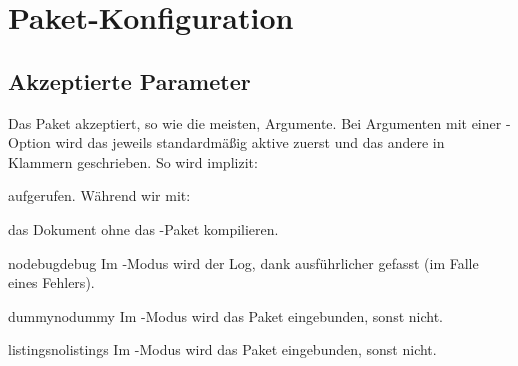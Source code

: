 \documentclass{sopra-base}
\begin{document}
%
%
%
%


\section{Paket-Konfiguration}    
    \subsection{Akzeptierte Parameter}
    Das Paket akzeptiert, so wie die meisten, Argumente. 
    Bei Argumenten mit einer -Option wird das jeweils standardmäßig aktive zuerst und das andere in Klammern
    geschrieben. So wird implizit:
\begin{plainlatex}
    \usepackage[nodebug,dummy,listings]{sopra-documentation}
\end{plainlatex}
    aufgerufen. Während wir mit:
\begin{plainlatex}
    \usepackage[nolistings]{sopra-documentation}
\end{plainlatex}
    das Dokument ohne das -Paket kompilieren.

    \begin{argument}{nodebug}{debug}
        \label{mrk:debug}Im -Modus wird der Log, dank  ausführlicher gefasst (im Falle eines Fehlers).
    \end{argument}

    \begin{argument}{dummy}{nodummy}
        \label{mrk:nodummy}Im -Modus wird das Paket  eingebunden, sonst nicht.
    \end{argument}

    \begin{argument}{listings}{nolistings}
        \label{mrk:nolistings}Im -Modus wird das Paket  eingebunden, sonst nicht.
    \end{argument}
\end{document}
